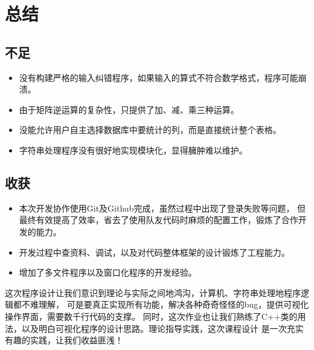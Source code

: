 \section{总结}
\subsection{不足}
\begin{itemize}
    \item 没有构建严格的输入纠错程序，如果输入的算式不符合数学格式，程序可能崩溃。
    \item 由于矩阵逆运算的复杂性，只提供了加、减、乘三种运算。
    \item 没能允许用户自主选择数据库中要统计的列，而是直接统计整个表格。
    \item 字符串处理程序没有很好地实现模块化，显得臃肿难以维护。
\end{itemize}

\subsection{收获}
\begin{itemize}
    \item 本次开发协作使用Git及Github完成，虽然过程中出现了登录失败等问题，
    但最终有效提高了效率，省去了使用队友代码时麻烦的配置工作，锻炼了合作开发的能力。
    \item 开发过程中查资料、调试，以及对代码整体框架的设计锻炼了工程能力。
    \item 增加了多文件程序以及窗口化程序的开发经验。
\end{itemize}
这次程序设计让我们意识到理论与实际之间地鸿沟，计算机、字符串处理地程序逻辑都不难理解，
可是要真正实现所有功能，解决各种奇奇怪怪的bug，提供可视化操作界面，需要数千行代码的支撑。
同时，这次作业也让我们熟练了C++类的用法，以及明白可视化程序的设计思路。理论指导实践，这次课程设计
是一次充实有趣的实践，让我们收益匪浅！






